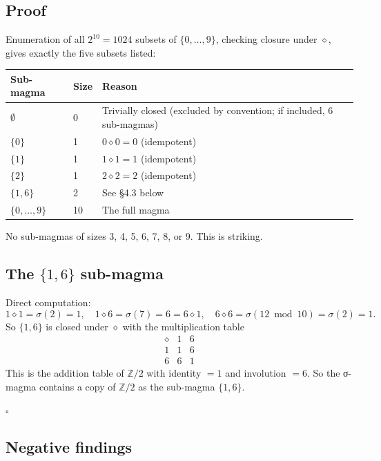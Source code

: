 \documentclass[11pt,reqno]{amsart}
\theoremstyle{plain}
\theoremstyle{definition}
\begin{document}
\subsection{Proof}

Enumeration of all $2^{10} = 1024$ subsets of $\{0, \ldots, 9\}$, checking closure under $\diamond$, gives exactly the five subsets listed:

\begin{center}
\begin{tabular}{lll}
\toprule
Sub-magma & Size & Reason \\
\midrule
$\emptyset$ & 0 & Trivially closed (excluded by convention; if included, 6 sub-magmas) \\
$\{0\}$ & 1 & $0 \diamond 0 = 0$ (idempotent) \\
$\{1\}$ & 1 & $1 \diamond 1 = 1$ (idempotent) \\
$\{2\}$ & 1 & $2 \diamond 2 = 2$ (idempotent) \\
$\{1, 6\}$ & 2 & See §4.3 below \\
$\{0, \ldots, 9\}$ & 10 & The full magma \\
\bottomrule
\end{tabular}
\end{center}

No sub-magmas of sizes 3, 4, 5, 6, 7, 8, or 9. This is striking.

\subsection{The $\{1, 6\}$ sub-magma}

Direct computation:
$$
1 \diamond 1 = \sigma(2) = 1, \quad
1 \diamond 6 = \sigma(7) = 6 = 6 \diamond 1, \quad
6 \diamond 6 = \sigma(12 \bmod 10) = \sigma(2) = 1.
$$
So $\{1, 6\}$ is closed under $\diamond$ with the multiplication table
$$
\begin{array}{c|cc}
\diamond & 1 & 6 \\
\hline
1 & 1 & 6 \\
6 & 6 & 1
\end{array}
$$
This is the addition table of $\mathbb{Z}/2$ with identity $= 1$ and involution $= 6$. So the σ-magma contains a copy of $\mathbb{Z}/2$ as the sub-magma $\{1, 6\}$.

$\square$

\subsection{Negative findings}
\end{document}
